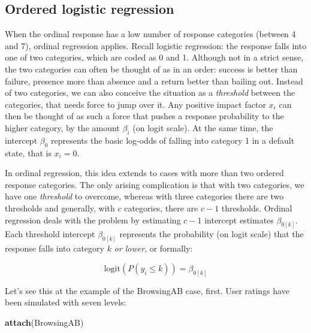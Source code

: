 \documentclass[]{svmono}
\newenvironment{Shaded}{\begin{snugshade}}{\end{snugshade}}
\newcommand{\KeywordTok}[1]{\textcolor[rgb]{0.13,0.29,0.53}{\textbf{#1}}}
\newcommand{\DataTypeTok}[1]{\textcolor[rgb]{0.13,0.29,0.53}{#1}}
\newcommand{\DecValTok}[1]{\textcolor[rgb]{0.00,0.00,0.81}{#1}}
\newcommand{\StringTok}[1]{\textcolor[rgb]{0.31,0.60,0.02}{#1}}
\newcommand{\OperatorTok}[1]{\textcolor[rgb]{0.81,0.36,0.00}{\textbf{#1}}}
\newcommand{\NormalTok}[1]{#1}
\begin{document}
\subsection{Ordered logistic
regression}\label{ordered-logistic-regression}

When the ordinal response has a low number of response categories
(between 4 and 7), ordinal regression applies. Recall logistic
regression: the response falls into one of two categories, which are
coded as 0 and 1. Although not in a strict sense, the two categories can
often be thought of as in an order: success is better than failure,
presence more than absence and a return better than bailing out. Instead
of two categories, we can also conceive the situation as a
\emph{threshold} between the categories, that needs force to jump over
it. Any positive impact factor \(x_i\) can then be thought of as such a
force that pushes a response probability to the higher category, by the
amount \(\beta_i\) (on logit scale). At the same time, the intercept
\(\beta_0\) represents the basic log-odds of falling into category 1 in
a default state, that is \(x_i = 0\).

In ordinal regression, this idea extends to cases with more than two
ordered response categories. The only arising complication is that with
two categories, we have one \emph{threshold} to overcome, whereas with
three categories there are two thresholds and generally, with \(c\)
categories, there are \(c - 1\) thresholds. Ordinal regression deals
with the problem by estimating \(c - 1\) intercept estimates
\(\beta_{0[k]}\). Each threshold intercept \(\beta_{0[k]}\) represents
the probability (on logit scale) that the response falls into category
\(k\) \emph{or lower}, or formally:

\[
\text{logit}(P(y_i \leq k)) = \beta_{0[k]}
\]

Let's see this at the example of the BrowsingAB case, first. User
ratings have been simulated with seven levels:

\begin{Shaded}
\begin{Highlighting}[]
\KeywordTok{attach}\NormalTok{(BrowsingAB)}
\end{Highlighting}
\end{Shaded}

\begin{Shaded}
\end{Shaded}
\end{document}
